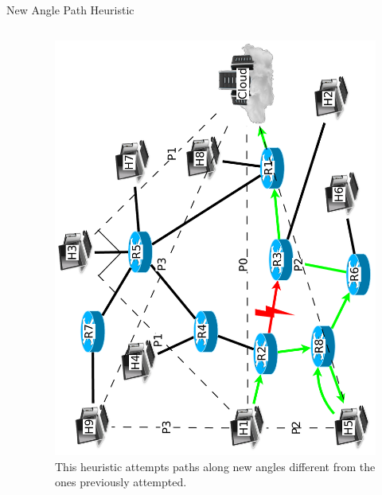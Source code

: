 \documentclass[pdftex]{beamer}
\begin{document}
\begin{frame}{New Angle Path Heuristic}
\begin{columns}

\begin{column}{.5\textwidth}
\begin{algorithm}[H]
\DontPrintSemicolon
{}
\SetAlgoLined
\SetAlgoLongEnd
\scriptsize
{}
\caption{New Angle Path Heuristic Algorithm}
\small
\end{algorithm}
\end{column}
	
\begin{column}{.5\textwidth}
\begin{figure}
\includegraphics[height=\textwidth,angle=-90]{new_angle}
\caption{This heuristic attempts paths along new angles different from the ones previously attempted.}
\end{figure}
\end{column}

\end{columns}
\end{frame}
\end{document}
